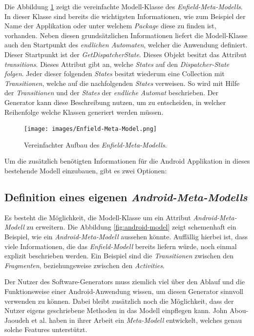 Die Abbildung \ref{fig:enfield-model} zeigt die vereinfachte Modell-Klasse des \textit{Enfield-Meta-Modells}. 
In dieser Klasse sind bereits die wichtigsten Informationen, wie zum Beispiel der Name der Applikation oder unter welchem \textit{Package} diese zu finden ist, vorhanden. Neben diesen grundsätzlichen Informationen liefert die Modell-Klasse auch den Startpunkt des \textit{endlichen Automaten}, welcher die Anwendung definiert. Dieser Startpunkt ist der \textit{GetDispatcherState}. Dieses Objekt besitzt das Attribut \textit{transitions}. Dieses Attribut gibt an, welche \textit{States} auf den \textit{Dispatcher-State folgen}. Jeder dieser folgenden \textit{States} besitzt wiederum eine Collection mit \textit{Transitionen}, welche auf die nachfolgenden \textit{States} verweisen. So wird mit Hilfe der \textit{Transitionen} und der \textit{States} der \textit{endliche Automat} beschrieben. Der Generator kann diese Beschreibung nutzen, um zu entscheiden, in welcher Reihenfolge welche Klassen generiert werden müssen.

\begin{figure}[H]
	\begin{center}
		\texttt{[image: images/Enfield-Meta-Model.png]}
		\caption{Vereinfachter Aufbau des \textit{Enfield-Meta-Modells}.}
		\label{fig:enfield-model}
	\end{center}
\end{figure}

Um die zusätzlich benötigten Informationen für die Android Applikation in dieses bestehende Modell einzubauen, gibt es zwei Optionen:

\subsection{Definition eines eigenen \textit{Android-Meta-Modells}}

Es besteht die Möglichkeit, die Modell-Klasse um ein Attribut \textit{Android-Meta-Modell} zu erweitern.
Die Abbildung \ref{fig:android-model} zeigt schemenhaft ein Beispiel, wie ein \textit{Android-Meta-Modell} aussehen könnte. Auffällig hierbei ist, dass viele Informationen, die das \textit{Enfield-Modell} bereits liefern würde, noch einmal explizit beschrieben werden. Ein Beispiel sind die \textit{Transitionen} zwischen den \textit{Fragmenten}, beziehungsweise zwischen den \textit{Activities}. 


Der Nutzer des Software-Generators muss ziemlich viel über den Ablauf und die Funktionsweise einer Android-Anwendung wissen, um diesen Generator sinnvoll verwenden zu können.
Dabei bleibt zusätzlich noch die Möglichkeit, dass der Nutzer eigens geschriebene Methoden in das Modell einpflegen kann. John Abou-Jaoudeh et al. haben in ihrer Arbeit ein \textit{Meta-Modell} entwickelt, welches genau solche Features unterstützt\cite{abou2015high}.

